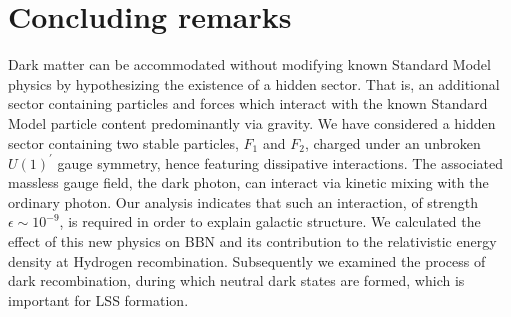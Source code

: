 \documentclass[12pt]{article}
\begin{document}
{{%

\section{Concluding remarks}

Dark matter can be accommodated without modifying known Standard Model
physics by hypothesizing the existence of a hidden sector. 
That is, an additional sector containing particles and forces which
interact with the known Standard Model particle content predominantly
via gravity. 
We have considered a hidden sector containing two stable particles,
$F_1$ and $F_2$, charged under an unbroken $U(1) ^{'}$ gauge symmetry, 
hence featuring dissipative interactions. The associated massless gauge
field, the dark photon, can 
interact via kinetic mixing with the ordinary photon. Our analysis
indicates that such an interaction, of 
strength $\epsilon \sim 10^{-9}$, is required in order to explain
galactic structure. We calculated the effect of this new 
physics on BBN and its contribution to the relativistic energy density
at Hydrogen recombination. Subsequently 
we examined the process of dark recombination, during which neutral dark
states are formed, which is important for 
LSS formation. 

}}
\end{document}

